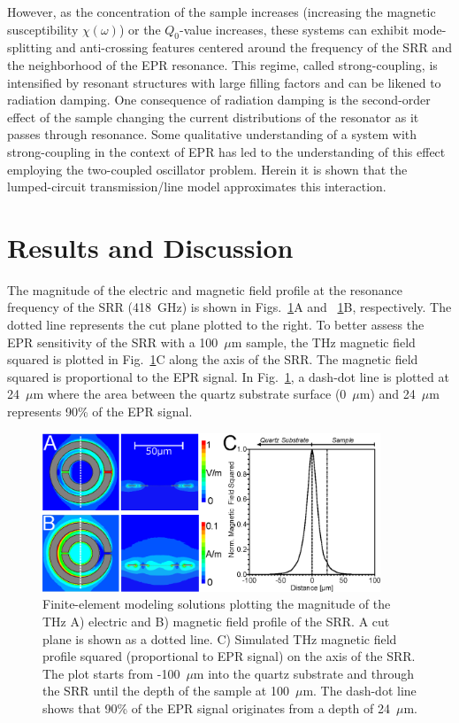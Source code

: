 However, as the concentration of the sample increases (increasing the magnetic susceptibility $\chi(\omega)$) or the $Q_0$-value increases, these systems can exhibit mode-splitting and anti-crossing features centered around the frequency of the SRR and the neighborhood of the EPR resonance. This regime, called strong-coupling, is intensified by resonant structures with large filling factors and can be likened to radiation damping. \cite{BloembergenRadDamp, BloomRadDamp, MeiboomRadDamp} One consequence of radiation damping is the second-order effect of the sample changing the current distributions of the resonator as it passes through resonance. Some qualitative understanding of a system with strong-coupling in the context of EPR has led to the understanding of this effect employing the two-coupled oscillator problem. \cite{SchneiderEPR,BOERO2013133,Scalari1323} Herein it is shown that the lumped-circuit transmission\-/line model approximates this interaction. 

\section{Results and Discussion}
The magnitude of the electric and magnetic field profile at the resonance frequency of the SRR (418~GHz) is shown in Figs.~\ref{ch3-fig:HFSS}A and ~\ref{ch3-fig:HFSS}B, respectively. The dotted line represents the cut plane plotted to the right. To better assess the EPR sensitivity of the SRR with a 100~$\mu$m sample, the THz magnetic field squared is plotted in Fig.~\ref{ch3-fig:HFSS}C along the axis of the SRR. The magnetic field squared is proportional to the EPR signal. In Fig.~\ref{ch3-fig:HFSS}, a dash-dot line is plotted at 24~$\mu$m where the area between the quartz substrate surface (0~$\mu$m) and 24~$\mu$m represents 90\% of the EPR signal.

\begin{figure}[htp]
\centering
  \includegraphics[width=0.9\textwidth]{Kapitel/Ch3-Images/02-AnsoftFields.eps}%
  \caption[Finite-element simulation solutions of SRR geometry.]{Finite-element modeling solutions plotting the magnitude of the THz A) electric and B) magnetic field profile of the SRR. A cut plane is shown as a dotted line. C) Simulated THz magnetic field profile squared (proportional to EPR signal) on the axis of the SRR. The plot starts from -100~$\mu$m into the quartz substrate and through the SRR until the depth of the sample at 100~$\mu$m. The dash-dot line shows that 90\% of the EPR signal originates from a depth of 24~$\mu$m.}
  \label{ch3-fig:HFSS}
\end{figure}

